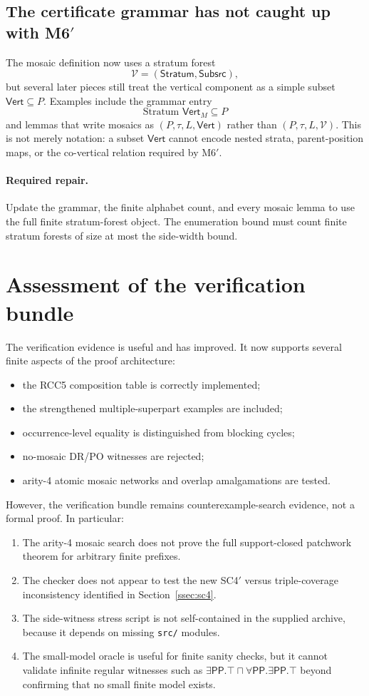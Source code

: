 \documentclass[11pt]{article}
\newcommand{\PP}{\mathsf{PP}}
\newcommand{\Stratum}{\mathsf{Stratum}}
\newcommand{\Subsrc}{\mathsf{Subsrc}}
\newcommand{\Vrt}{\mathsf{Vert}}
\begin{document}
\subsection{The certificate grammar has not caught up with M6$'$}

The mosaic definition now uses a stratum forest
\[
  \mathcal V=(\Stratum,\Subsrc),
\]
but several later pieces still treat the vertical component as a simple subset
$\Vrt\subseteq P$.  Examples include the grammar entry
\[
  \text{Stratum }\Vrt_M \subseteq P
\]
and lemmas that write mosaics as $(P,\tau,L,\Vrt)$ rather than
$(P,\tau,L,\mathcal V)$.  This is not merely notation: a subset $\Vrt$ cannot
encode nested strata, parent-position maps, or the co-vertical relation required
by M6$'$.

\paragraph{Required repair.}
Update the grammar, the finite alphabet count, and every mosaic lemma to use the
full finite stratum-forest object.  The enumeration bound must count finite
stratum forests of size at most the side-width bound.

\section{Assessment of the verification bundle}

The verification evidence is useful and has improved.  It now supports several
finite aspects of the proof architecture:
\begin{itemize}[leftmargin=2em]
  \item the RCC5 composition table is correctly implemented;
  \item the strengthened multiple-superpart examples are included;
  \item occurrence-level equality is distinguished from blocking cycles;
  \item no-mosaic DR/PO witnesses are rejected;
  \item arity-4 atomic mosaic networks and overlap amalgamations are tested.
\end{itemize}
However, the verification bundle remains counterexample-search evidence, not a
formal proof.  In particular:
\begin{enumerate}[leftmargin=2em]
  \item The arity-4 mosaic search does not prove the full support-closed
        patchwork theorem for arbitrary finite prefixes.
  \item The checker does not appear to test the new SC4$'$ versus
        triple-coverage inconsistency identified in Section~\ref{ssec:sc4}.
  \item The side-witness stress script is not self-contained in the supplied
        archive, because it depends on missing \texttt{src/} modules.
  \item The small-model oracle is useful for finite sanity checks, but it cannot
        validate infinite regular witnesses such as
        $\exists\PP.\top\sqcap\forall\PP.\exists\PP.\top$ beyond confirming
        that no small finite model exists.
\end{enumerate}
\end{document}
